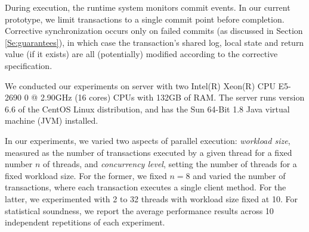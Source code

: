During execution, the runtime system monitors commit events. In our current prototype, we limit transactions to a single commit point before completion. Corrective synchronization occurs only on failed commits (as discussed in Section \ref{Se:guarantees}), in which case the transaction's shared log, local state and return value (if it exists) are all (potentially) modified according to the corrective specification. 


%
We conducted our experiments on server with two Intel(R) Xeon(R) CPU E5-2690 0 @ 2.90GHz (16 cores) CPUs with 132GB of RAM. The server runs version
6.6 of the CentOS Linux distribution, and has the Sun 64-Bit 1.8 Java virtual machine (JVM) installed.

In our experiments, we varied two aspects of parallel execution: \emph{workload size}, measured as the number of transactions executed by a given thread for a fixed number $n$ of threads, and \emph{concurrency level}, setting the number of threads for a fixed workload size. For the former, we fixed $n=8$ and varied the number of transactions, where each transaction executes a single client method. For the latter, we experimented with 2 to 32 threads with workload size fixed at 10.
For statistical soundness, we report the average performance results across 10 independent repetitions of each experiment.

